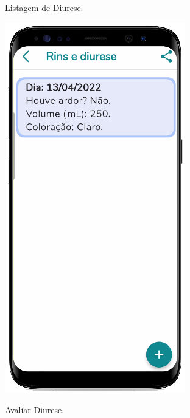 \begin{figure}[htb]
    \centering
    \begin{minipage}{0.47\textwidth}
        \centering
        \caption{Listagem de Diurese.}\label{fig_list_diurese}
        \includegraphics[scale=0.66]{Imagens/desenvolvimento/app/list_diurese.png}
    \end{minipage}
    \hfill
    \begin{minipage}{0.45\textwidth}
        \centering
        \caption{Avaliar Diurese.}\label{fig_reg_diurese}

\end{minipage}
\end{figure}

